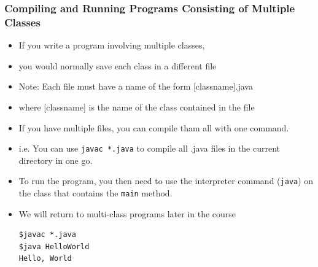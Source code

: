 \documentclass{beamer}
\begin{document}
\begin{frame}[fragile]
\frametitle{Compiling and Running Programs Consisting of Multiple Classes}
\begin{itemize}
\item If you write a program involving multiple classes,
\item you would normally save each  class in a different file
\item Note: Each file must have a name of the form [classname].java
\item where [classname] is the name of the class contained in the file
\item If you have multiple files, you can compile tham all with one command. 
\item i.e. You can use \lstinline!javac *.java! to compile all .java files in the current directory in one go.
\item To run the program, you then need to use the interpreter command (\lstinline!java!) on the class that contains the \lstinline!main! method. 
\item We will return to multi-class programs later in the course
\begin{block}{}
\begin{lstlisting}
$javac *.java
$java HelloWorld
Hello, World
\end{lstlisting}
\end{block}
\end{itemize}
\end{frame}
\end{document}
